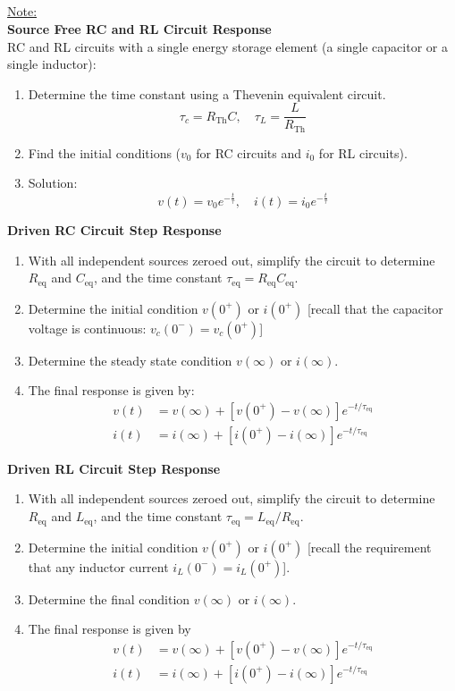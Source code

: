 \documentclass[12pt]{article}
\title{}
\date{}
\author{}
\begin{document}
\subsection*{}

\underline{Note:}\\
\textbf{Source Free RC and RL Circuit Response}\\
RC and RL circuits with a single energy storage element (a single capacitor or a single inductor):
\begin{enumerate}
    \item Determine the time constant using a Thevenin equivalent circuit.
    \[\tau_c = R_{\text{Th}} C, \quad \tau_L = \frac{L}{R_{\text{Th}}}\]
    \item Find the initial conditions ($v_0$ for RC circuits and $i_0$ for RL circuits).
    \item Solution:
    \[v(t) = v_0 e^{-\frac{t}{\tau}}, \quad i(t) = i_0 e^{-\frac{t}{\tau}}\]
\end{enumerate}
\textbf{Driven RC Circuit Step Response}
\begin{enumerate}
    \item With all independent sources zeroed out, simplify the circuit to determine $R_{\text{eq}}$ and $C_{\text{eq}}$, and the time constant $\tau_{\text{eq}} = R_{\text{eq}} C_{\text{eq}}$.
    \item Determine the initial condition $v(0^+)$ or $i(0^+)$ [recall that the capacitor voltage is continuous: $v_c(0^-) = v_c(0^+)$]
    \item Determine the steady state condition $v(\infty)$ or $i(\infty)$.
    \item The final response is given by:
  \[\boxed{\begin{aligned}
    v(t) &= v(\infty) + [v(0^+) - v(\infty)] e^{-t/\tau_{\text{eq}}} \\
    i(t) &= i(\infty) + [i(0^+) - i(\infty)] e^{-t/\tau_{\text{eq}}}
    \end{aligned}}\]
\end{enumerate}
\textbf{Driven RL Circuit Step Response}
\begin{enumerate}
    \item With all independent sources zeroed out, simplify the circuit to determine $R_{\text{eq}}$ and $L_{\text{eq}}$, and the time constant $\tau_{\text{eq}} = L_{\text{eq}}/R_{\text{eq}}$.
    \item Determine the initial condition $v(0^+)$ or $i(0^+)$ [recall the requirement that any inductor current $i_L(0^-) = i_L(0^+)$].
    \item Determine the final condition $v(\infty)$ or $i(\infty)$.
    \item The final response is given by
     \[\boxed{\begin{aligned}
    v(t) &= v(\infty) + [v(0^+) - v(\infty)] e^{-t/\tau_{\text{eq}}} \\
    i(t) &= i(\infty) + [i(0^+) - i(\infty)] e^{-t/\tau_{\text{eq}}}
    \end{aligned}}\]
\end{enumerate}
\end{document}
